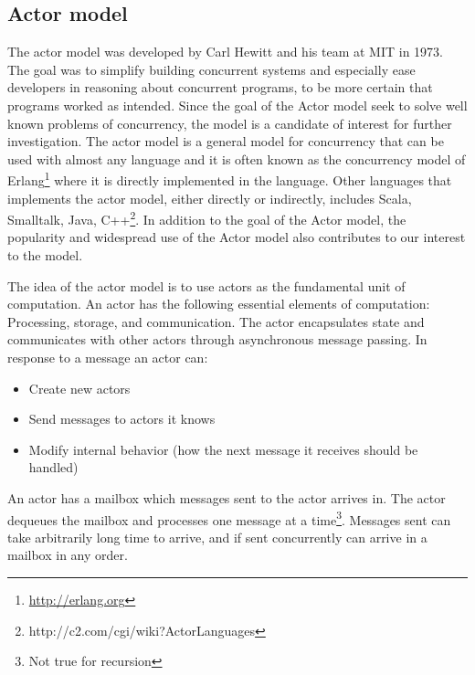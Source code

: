 \subsection{Actor model}
The actor model was developed by Carl Hewitt and his team at MIT in 1973\cite{hewitt1973universal}. The goal was to simplify building concurrent systems and especially ease developers in reasoning about concurrent programs, to be more certain that programs worked as intended\cite[p. 14]{haller2012actors}. Since the goal of the Actor model seek to solve well known problems of concurrency, the model is a candidate of interest for further investigation. The actor model is a general model for concurrency that can be used with almost any language and it is often known as the concurrency model of Erlang\footnote{\url{http://erlang.org}} where it is directly implemented in the language\cite[p. 115]{sevenModels}. Other languages that implements the actor model, either directly or indirectly, includes Scala, Smalltalk, Java, C++\footnote{http://c2.com/cgi/wiki?ActorLanguages}. In addition to the goal of the Actor model,  the popularity and widespread use of the Actor model also contributes to our interest to the model.

The idea of the actor model is to use actors as the fundamental unit of computation. An actor has the following essential elements of computation\cite{actorLangNextVideo}: Processing, storage, and communication. The actor encapsulates state and communicates with other actors through asynchronous message passing. In response to a message an actor can\cite{hewitt2014actor}:
\begin{itemize}
\item Create new actors
\item Send messages to actors it knows
\item Modify internal behavior (how the next message it receives should be handled)
\end{itemize}
An actor has a mailbox which messages sent to the actor arrives in. The actor dequeues the mailbox and processes one message at a time\footnote{Not true for recursion\cite{actorLangNextVideo}}. Messages sent can take arbitrarily long time to arrive, and if sent concurrently can arrive in a mailbox in any order\cite{hewitt2014actor}.

